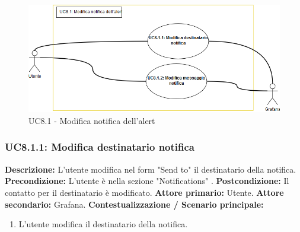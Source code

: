                          \begin{figure}[!htbp]
                    	\centering
                    	\includegraphics[width=\textwidth]{UC8-1.png}
                    	\caption{UC8.1 - Modifica notifica dell'alert}
                    	\label{uc8.1}
                    \end{figure}
                        
                \subsubsection{UC8.1.1: Modifica destinatario notifica }
                    \textbf{Descrizione:} L’utente modifica nel form "Send to" il destinatario della notifica.
                    \newline
                    \textbf{Precondizione:} L'utente è nella sezione "Notifications" .
                    \newline
                    \textbf{Postcondizione:} Il contatto per il destinatario è modificato.
                    \newline
                    \textbf{Attore primario:} Utente.
                    \newline
                    \textbf{Attore secondario:} Grafana.
                    \newline
                    \textbf{Contestualizzazione / Scenario principale:} \begin{enumerate}
                            \item L'utente modifica il destinatario della notifica.
                        \end{enumerate}        
                
                

